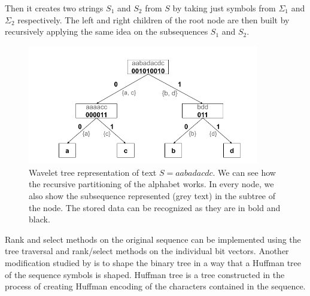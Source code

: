 Then it creates two strings $S_1$ and $S_2$ from $S$ by taking just symbols
from $\Sigma_1$ and $\Sigma_2$ respectively. The left and right children of the root node
are then built by recursively applying the same idea on the subsequences $S_1$ and $S_2$.

\begin{figure}
	\centerline{
		\includegraphics[width=0.9\textwidth, height=0.3\textheight]{images/wavelet_tree}
	}
	\caption[TODO]{Wavelet tree representation of text $S=aabadacdc$. We can see how the
	recursive partitioning of the alphabet works. In every node, we also show the
	subsequence represented (grey text) in the subtree of the node. The stored data can be
	recognized as they are in bold and black.
	}
	\label{obr:WaveletTreeExample}
\end{figure}

Rank and select methods on the original sequence can be implemented using the tree
traversal and rank/select methods on the individual bit vectors. Another modification
studied by \cite{makinen2005succinct} is to shape the binary tree in a way that a Huffman
tree of the sequence symbols is shaped. Huffman tree is a tree constructed in the
process of creating Huffman encoding of the characters contained in the sequence.